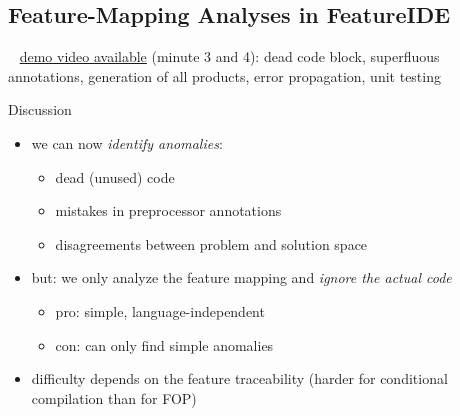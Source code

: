 \subsection{Feature-Mapping Analyses in FeatureIDE}

\begin{frame}{\myframetitle}
	\begin{fancycolumns}[widths={57,43}]
		~
		\href{https://youtu.be/jVe7f32mLCQ?t=125}{demo video available} (minute 3 and 4): dead code block, superfluous annotations, generation of all products, error propagation, unit testing
	\nextcolumn
		\begin{note}{Discussion}
			\begin{itemize}
				\item we can now \emph{identify anomalies}:
				\begin{itemize}
					\item dead (unused) code
					\item mistakes in preprocessor annotations
					\item disagreements between problem and solution space
				\end{itemize}
				\item but: we only analyze the feature mapping and \emph{ignore the actual code}
				\begin{itemize}
					\item pro: simple, language-independent
					\item con: can only find simple anomalies
				\end{itemize}
				\item difficulty depends on the feature traceability (harder for conditional compilation than for FOP)
			\end{itemize}
		\end{note}
	\end{fancycolumns}
\end{frame}
